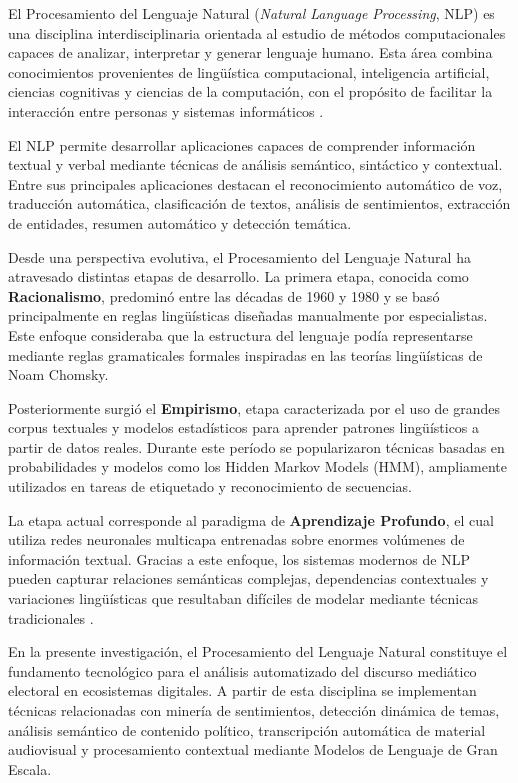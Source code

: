 El Procesamiento del Lenguaje Natural (\textit{Natural Language Processing}, NLP) es una disciplina interdisciplinaria orientada al estudio de métodos computacionales capaces de analizar, interpretar y generar lenguaje humano. Esta área combina conocimientos provenientes de lingüística computacional, inteligencia artificial, ciencias cognitivas y ciencias de la computación, con el propósito de facilitar la interacción entre personas y sistemas informáticos \parencite{bk_deng2018deeplearningnlp}.

El NLP permite desarrollar aplicaciones capaces de comprender información textual y verbal mediante técnicas de análisis semántico, sintáctico y contextual. Entre sus principales aplicaciones destacan el reconocimiento automático de voz, traducción automática, clasificación de textos, análisis de sentimientos, extracción de entidades, resumen automático y detección temática.

Desde una perspectiva evolutiva, el Procesamiento del Lenguaje Natural ha atravesado distintas etapas de desarrollo. La primera etapa, conocida como \textbf{Racionalismo}, predominó entre las décadas de 1960 y 1980 y se basó principalmente en reglas lingüísticas diseñadas manualmente por especialistas. Este enfoque consideraba que la estructura del lenguaje podía representarse mediante reglas gramaticales formales inspiradas en las teorías lingüísticas de Noam Chomsky.

Posteriormente surgió el \textbf{Empirismo}, etapa caracterizada por el uso de grandes corpus textuales y modelos estadísticos para aprender patrones lingüísticos a partir de datos reales. Durante este período se popularizaron técnicas basadas en probabilidades y modelos como los Hidden Markov Models (HMM), ampliamente utilizados en tareas de etiquetado y reconocimiento de secuencias.

La etapa actual corresponde al paradigma de \textbf{Aprendizaje Profundo}, el cual utiliza redes neuronales multicapa entrenadas sobre enormes volúmenes de información textual. Gracias a este enfoque, los sistemas modernos de NLP pueden capturar relaciones semánticas complejas, dependencias contextuales y variaciones lingüísticas que resultaban difíciles de modelar mediante técnicas tradicionales \parencite{bk_deng2018deeplearningnlp}.

En la presente investigación, el Procesamiento del Lenguaje Natural constituye el fundamento tecnológico para el análisis automatizado del discurso mediático electoral en ecosistemas digitales. A partir de esta disciplina se implementan técnicas relacionadas con minería de sentimientos, detección dinámica de temas, análisis semántico de contenido político, transcripción automática de material audiovisual y procesamiento contextual mediante Modelos de Lenguaje de Gran Escala.

